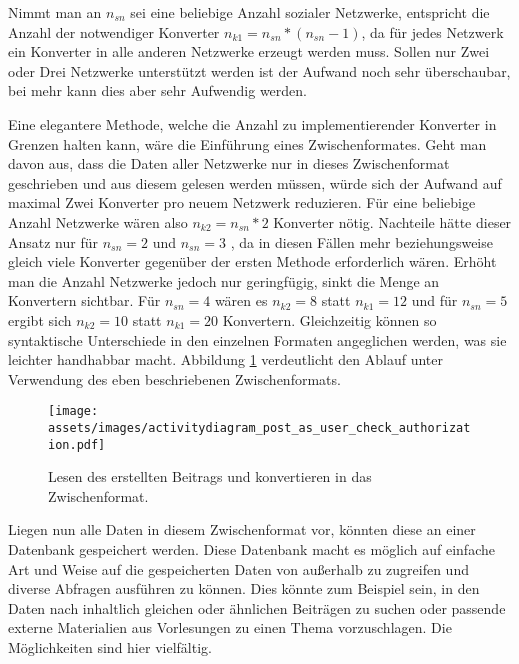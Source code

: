 Nimmt man an $n_{sn}$ sei eine beliebige Anzahl sozialer Netzwerke, entspricht die Anzahl der notwendiger Konverter $ n_{k1}= n_{sn}*(n_{sn}-1) $, da für jedes Netzwerk ein Konverter in alle anderen Netzwerke erzeugt werden muss. Sollen nur Zwei oder Drei Netzwerke unterstützt werden ist der Aufwand noch sehr überschaubar, bei mehr kann dies aber sehr Aufwendig werden. 

\medskip

Eine elegantere Methode, welche die Anzahl zu implementierender Konverter in Grenzen halten kann, wäre die Einführung eines Zwischenformates. Geht man davon aus, dass die Daten aller Netzwerke nur in dieses Zwischenformat geschrieben und aus diesem gelesen werden müssen, würde sich der Aufwand auf maximal Zwei Konverter pro neuem Netzwerk reduzieren. Für eine beliebige Anzahl Netzwerke wären also $ n_{k2} = n_{sn} * 2 $ Konverter nötig. Nachteile hätte dieser Ansatz nur für $ n_{sn}=2 $ und $ n_{sn}=3$ , da in diesen Fällen mehr beziehungsweise gleich viele Konverter gegenüber der ersten Methode erforderlich wären. Erhöht man die Anzahl Netzwerke jedoch nur geringfügig, sinkt die Menge an Konvertern sichtbar. Für $ n_{sn} = 4 $ wären es $ n_{k2} = 8 $ statt $ n_{k1} = 12 $ und für $ n_{sn} = 5 $ ergibt sich $ n_{k2} = 10 $ statt $ n_{k1} = 20 $ Konvertern. Gleichzeitig können so syntaktische Unterschiede in den einzelnen Formaten angeglichen werden, was sie leichter handhabbar macht. Abbildung \ref{fig:lesen_von_beitrag_und_convertieren} verdeutlicht den Ablauf unter Verwendung des eben beschriebenen Zwischenformats.

\medskip

\begin{figure}[ht]
     \texttt{[image: assets/images/activitydiagram\_post\_as\_user\_check\_authorization.pdf]}
    \caption{
        Lesen des erstellten Beitrags und konvertieren in das Zwischenformat.
    }
    \label{fig:lesen_von_beitrag_und_convertieren}
\end{figure}

Liegen nun alle Daten in diesem Zwischenformat vor, könnten diese an einer Datenbank gespeichert werden. Diese Datenbank macht es möglich auf einfache Art und Weise auf die gespeicherten Daten von außerhalb zu zugreifen und diverse Abfragen ausführen zu können. Dies könnte zum Beispiel sein, in den Daten nach inhaltlich gleichen oder ähnlichen Beiträgen zu suchen oder passende externe Materialien aus Vorlesungen zu einen Thema vorzuschlagen. Die Möglichkeiten sind hier vielfältig. 

